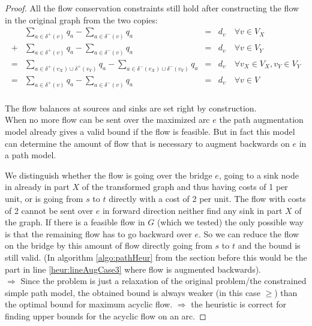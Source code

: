 \begin{proof}
All the flow conservation constraints still hold after constructing the flow in the original graph from the two copies:
\begin{align*}
& \sum_{a\in \delta^+(v)}q_a - \sum_{a\in\delta^- (v)}q_a &=& d_v\ &\forall v\in V_X \\
+& \sum_{a\in \delta^+(v)}q_a - \sum_{a\in\delta^- (v)}q_a &=& d_v\ &\forall v\in V_Y \\
=& \sum_{a\in \delta^+(v_X)\cup\delta^+(v_Y)}q_a - \sum_{a\in\delta^- (v_X)\cup\delta^-(v_Y)}q_a &=& d_v\ &\forall 
v_X\in V_X, v_Y\in V_Y \\
=& \sum_{a\in \delta^+(v)}q_a - \sum_{a\in\delta^- (v)}q_a &=& d_v\ &\forall v\in V \\
\end{align*}

The flow balances at sources and sinks are set right by construction.\\

When no more flow can be sent over the maximized arc $e$ the path augmentation model already gives a valid bound 
if the flow is feasible. But in fact this model can determine the amount of flow that is necessary to augment backwards 
on $e$ in a path model.

We distinguish whether the flow is going over the bridge $e$, going to a sink node in already in part $X$ of the 
transformed graph and thus having costs of 1 per unit, 
or is going from $s$ to $t$ directly with a cost of 2 per unit. The flow with costs of 2 cannot be sent over $e$ in 
forward direction neither find any sink in part $X$ of the graph. If there is a feasible flow in $G$ (which we tested) 
the only possible way is that the remaining flow has to go backward over $e$. So we can reduce the flow on the 
bridge by this amount of flow directly going from $s$ to $t$ and the bound is still valid. (In algorithm 
\ref{algo:pathHeur} from the section before this would be the part in line \ref{heur:lineAugCase3} where flow is 
augmented backwards).\\

$\Rightarrow$ Since the problem is just a relaxation of the original problem/the constrained simple path model, the 
obtained bound is always weaker (in this case $\ge$) than the optimal bound for maximum acyclic flow. 
$\Rightarrow$ the heuristic is correct for finding upper bounds for the acyclic flow on an arc.

\end{proof}%

